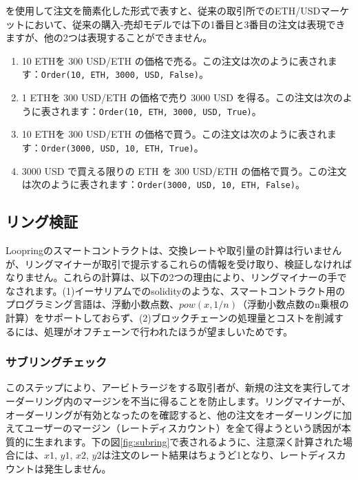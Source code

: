 \documentclass{article}
\begin{document}
\begin{multicols}{2}
を使用して注文を簡素化した形式で表すと、従来の取引所でのETH/USDマーケットにおいて、従来の購入-売却モデルでは下の1番目と3番目の注文は表現できますが、他の2つは表現することができません。

\begin{enumerate}
	\item 10 ETHを 300 USD/ETH の価格で売る。この注文は次のように表されます：\verb|Order(10, ETH, 3000, USD, False)|。
	\item 1 ETHを 300 USD/ETH の価格で売り 3000 USD を得る。この注文は次のように表されます：\verb|Order(10, ETH, 3000, USD, True)|。
	\item 10 ETHを 300 USD/ETH の価格で買う。この注文は次のように表されます：\verb|Order(3000, USD, 10, ETH, True)|。
	\item 3000 USD で買える限りの ETH を 300 USD/ETH の価格で買う。この注文は次のように表されます：\verb|Order(3000, USD, 10, ETH, False)|。
\end{enumerate}



\subsection{リング検証\label{sec:ring_verification}}

Loopringのスマートコントラクトは、交換レートや取引量の計算は行いませんが、リングマイナーが取引で提示するこれらの情報を受け取り、検証しなければなりません。これらの計算は、以下の2つの理由により、リングマイナーの手でなされます。(1)イーサリアムでのsolidity\cite{dannen2017introducing}のような、スマートコントラクト用のプログラミング言語は、浮動小数点数、$pow(x, 1/n)$（浮動小数点数のn乗根の計算）をサポートしておらず、(2)ブロックチェーンの処理量とコストを削減するには、処理がオフチェーンで行われたほうが望ましいためです。


\subsubsection{サブリングチェック\label{sec:sub_ring_check}}
このステップにより、アービトラージをする取引者が、新規の注文を実行してオーダーリング内のマージンを不当に得ることを防止します。リングマイナーが、オーダーリングが有効となったのを確認すると、他の注文をオーダーリングに加えてユーザーのマージン（レートディスカウント）を全て得ようという誘因が本質的に生まれます。下の図\ref{fig:subring}で表されるように、注意深く計算された場合には、$x1$, $y1$, $x2$, $y2$は注文のレート結果はちょうど1となり、レートディスカウントは発生しません。


\end{multicols}
\end{document}
